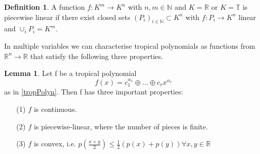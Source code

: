 \documentclass{article}
\theoremstyle{definition}
\newtheorem{lemma}[theorem]{Lemma}
\newtheorem{definition}[theorem]{Definition}
\begin{document}
\begin{definition}
A function $f : K^{m} \to K^{n}$ with $n, m \in \mathbb{N}$ and $K = \mathbb{R}$ or $K = \mathbb{T}$ is piecewise linear if there exist closed sets $(P_{i})_{i \in \mathbb{N}} \subset K^{n}$ with $f : P_{i} \to K^{n}$ linear and $\cup_{i}P_{i} = K^{m}$.
\end{definition}

In multiple variables we can characterise tropical polynomials as functions from $\mathbb{R}^{n} \to \mathbb{R}$ that satisfy the following three properties.

\begin{lemma}\label{lemma:trop_properties}
Let f be a tropical polynomial
$$ f(x) = c_1^{\alpha_1} \oplus \dots \oplus c_r x^{\alpha_r}$$ as in \ref{tropPolyn}. Then f has three important properties:
\begin{itemize}
\item[(1)]
$f$ is continuous.
\item[(2)]
$f$ is piecewise-linear, where the number of pieces is finite.
\item[(3)]
$f$ is convex, i.e. $p(\frac{x + y}{2}) \leq \frac{1}{2}(p(x)+p(y)) \forall x,y \in \mathbb{R}$
\end{itemize}
\end{lemma}
\end{document}
